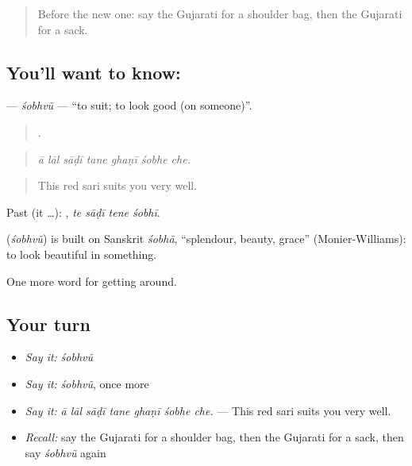 \label{lesson:GU-C433-sobhvu}



\begin{quote}
Before the new one: say the Gujarati for a shoulder bag, then the Gujarati for a sack.
\end{quote}

\subsection*{You'll want to know: }
\textbf{} — \emph{śobhvũ} — \textquotedblleft{}to suit; to look good (on someone)\textquotedblright{}.

\begin{quote}
      .
\end{quote}

\begin{quote}
\emph{ā lāl sāḍī tane ghaṇī śobhe che.}
\end{quote}

\begin{quote}
This red sari suits you very well.
\end{quote}

Past (it …):    , \emph{te sāḍī tene śobhī}.

\begin{cousinweb}
\textbf{} (\emph{śobhvũ}) is built on Sanskrit \emph{śobhā}, \textquotedblleft{}splendour, beauty, grace\textquotedblright{} (Monier-Williams): to look beautiful in something.
\end{cousinweb}

\begin{grammarlens}[title={What you've built}]
One more word for getting around.
\end{grammarlens}

\subsection*{Your turn}
\begin{itemize}
\raggedright
  \item \emph{Say it:} \emph{śobhvũ}
  \item \emph{Say it:} \emph{śobhvũ}, once more
  \item \emph{Say it:} \emph{ā lāl sāḍī tane ghaṇī śobhe che.} — This red sari suits you very well.
  \item \emph{Recall:} say the Gujarati for a shoulder bag, then the Gujarati for a sack, then say \emph{śobhvũ} again
\end{itemize}

